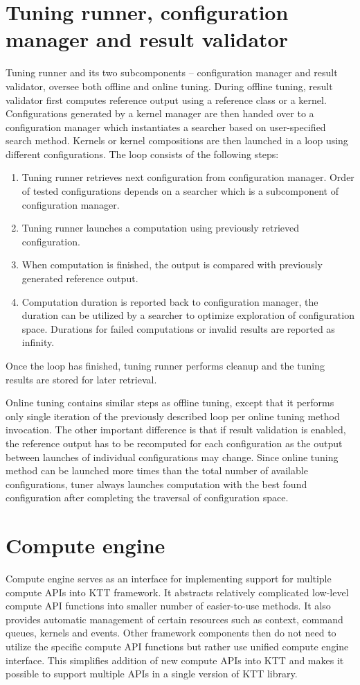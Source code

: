 \documentclass
[
    digital, %
    oneside, %
    table, %
    nolof, %
    nolot, %
    nocover %
]{fithesis3}
\begin{document}
\section{Tuning runner, configuration manager and result validator}
Tuning runner and its two subcomponents -- configuration manager and result validator, oversee both offline and online tuning. During offline tuning,
result validator first computes reference output using a reference class or a kernel. Configurations generated by a kernel manager are then handed over to
a configuration manager which instantiates a searcher based on user-specified search method. Kernels or kernel compositions are then launched in a loop
using different configurations. The loop consists of the following steps:
\begin{enumerate}
    \item Tuning runner retrieves next configuration from configuration manager. Order of tested configurations depends on a searcher which is
    a subcomponent of configuration manager.
    \item Tuning runner launches a computation using previously retrieved configuration.
    \item When computation is finished, the output is compared with previously generated reference output.
    \item Computation duration is reported back to configuration manager, the duration can be utilized by a searcher to optimize exploration of
    configuration space. Durations for failed computations or invalid results are reported as infinity.
\end{enumerate}
Once the loop has finished, tuning runner performs cleanup and the tuning results are stored for later retrieval.

Online tuning contains similar steps as offline tuning, except that it performs only single iteration of the previously described loop per online tuning
method invocation. The other important difference is that if result validation is enabled, the reference output has to be recomputed for each
configuration as the output between launches of individual configurations may change. Since online tuning method can be launched more times than the
total number of available configurations, tuner always launches computation with the best found configuration after completing the traversal of
configuration space.

\section{Compute engine}
Compute engine serves as an interface for implementing support for multiple compute APIs into KTT framework. It abstracts relatively complicated
low-level compute API functions into smaller number of easier-to-use methods. It also provides automatic management of certain resources such as context,
command queues, kernels and events. Other framework components then do not need to utilize the specific compute API functions but rather use unified
compute engine interface. This simplifies addition of new compute APIs into KTT and makes it possible to support multiple APIs in a single version of
KTT library.
\end{document}
